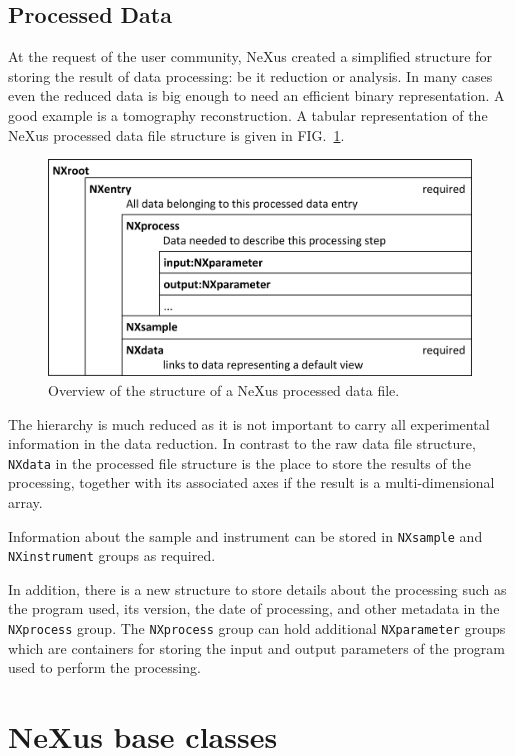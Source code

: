 \documentclass[%
 aip,
rsi,
 amsmath,amssymb,
 reprint,%
]{revtex4-1}
\begin{document}
\subsection{Processed Data}

At the request of the user community, NeXus created a simplified structure for storing the result of data 
processing: be it reduction or analysis. In many cases even the reduced data is big enough to need 
an efficient binary representation. A good example is a tomography reconstruction. A tabular representation 
of the NeXus processed data file structure is given in FIG.~\ref{procfile}. 

\begin{figure}
\includegraphics[width=\columnwidth]{figure3}
\caption{\label{procfile}Overview of the structure of a NeXus processed data file.}
\end{figure}

The hierarchy is much reduced as it is not important to carry all experimental information in the data 
reduction. In contrast to the raw data file structure, \texttt{NXdata} in the processed file structure is the place 
to store the results of the processing, together with its associated axes if the result is a multi-dimensional array.   
 
Information about the sample and instrument can be stored in \texttt{NXsample} and \texttt{NXinstrument} groups as required. 

In addition, there is a new structure to store details about the processing such as the program used, its version, 
the date of processing, and other metadata 
in the \texttt{NXprocess} group. The \texttt{NXprocess} group can hold additional \texttt{NXparameter} groups which are containers 
for storing the input and output parameters of the program used to perform the processing. 


\section{NeXus base classes}
\end{document}
